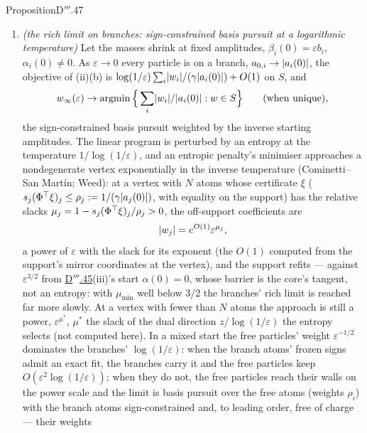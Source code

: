 \begin{thm}{Proposition}{D$'''$.47}
\begin{enumerate}[label=\textup{(\roman*)}]
    fits in $K$, no coefficient vanishes on all of it and nothing goes extinct ---
    \hyperref[res:thmDppp:45]{Proposition D$'''$.45}(iii) with branches ---; otherwise the wrong-signed particles die and
    the loop fits what the frozen signs allow, in the least-squares sense.
  \item \emph{(the rich limit on branches: sign-constrained basis pursuit at a logarithmic temperature)} Let the masses
    shrink at fixed amplitudes, $\beta_i(0) = \varepsilon b_i$, $\alpha_i(0)\ne0$. As $\varepsilon\to0$ every particle is
    on a branch, $a_{0,i}\to\lvert a_i(0)\rvert$, the objective of (ii)(b) is
    $\log(1/\varepsilon)\sum_i\lvert w_i\rvert/(\gamma\lvert a_i(0)\rvert) + O(1)$ on $S$, and
    \[
      w_\infty(\varepsilon)\to\operatorname{argmin}\Big\{\sum_i\lvert w_i\rvert/\lvert a_i(0)\rvert : w\in S\Big\}\qquad
      \text{(when unique)},
    \]
    the sign-constrained basis pursuit weighted by the inverse starting amplitudes. The linear program is perturbed by
    an entropy at the temperature $1/\log(1/\varepsilon)$, and an entropic penalty's minimiser approaches a
    nondegenerate vertex exponentially in the inverse temperature (Cominetti--San Mart\'in; Weed): at a vertex with $N$
    atoms whose certificate $\xi$ ($s_j(\Phi^\top\xi)_j\le\rho_j := 1/(\gamma\lvert a_j(0)\rvert)$, with equality on the support)
    has the relative slacks $\mu_j = 1 - s_j(\Phi^\top\xi)_j/\rho_j > 0$, the off-support coefficients are
    \[
      \lvert w_j\rvert = e^{O(1)}\varepsilon^{\mu_j},
    \]
    a power of $\varepsilon$ with the slack for its exponent (the $O(1)$ computed from the support's mirror coordinates
    at the vertex), and the support refits --- against $\varepsilon^{3/2}$ from
    \hyperref[res:thmDppp:45]{D$'''$.45}(iii)'s start $\alpha(0) = 0$, whose barrier is the core's tangent, not an
    entropy: with $\mu_{\min}$ well below 3/2 the branches' rich limit is reached far more slowly. At a vertex with fewer
    than $N$ atoms the approach is still a power, $\varepsilon^{\mu^*}$, $\mu^*$ the slack of the dual direction
    $z/\log(1/\varepsilon)$ the entropy selects (not computed here). In a mixed start the free particles' weight
    $\varepsilon^{-1/2}$ dominates the branches' $\log(1/\varepsilon)$: when the branch atoms' frozen signs admit an
    exact fit, the branches carry it and the free particles keep $O(\varepsilon^2\log(1/\varepsilon))$; when they do
    not, the free particles reach their walls on the power scale and the limit is basis pursuit over the free atoms
    (weights $\rho_i$) with the branch atoms sign-constrained and, to leading order, free of charge --- their weights

\end{enumerate}
\end{thm}
